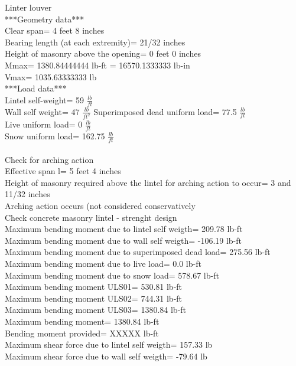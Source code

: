 Linter louver \\
***Geometry data*** \\
Clear span=  4 feet 8 inches \\
Bearing length (at each extremity)=  21/32 inches \\
Height of masonry above the opening=  0 feet 0 inches \\
Mmax=  1380.84444444 lb-ft = 16570.1333333  lb-in \\
Vmax=  1035.63333333 lb \\
***Load data*** \\
Lintel self-weight=  59  $\frac{lb}{ft}$ \\
Wall self weight=  47 $\frac{lb}{ft^2}$
Superimposed dead uniform load=  77.5 $\frac{lb}{ft}$ \\
Live uniform load=  0 $\frac{lb}{ft}$ \\
Snow uniform load=  162.75 $\frac{lb}{ft}$ \\
 \\
Check for arching action \\
Effective span l=  5 feet 4 inches \\
Height of masonry required above the lintel for arching action to occur=  3 and 11/32 inches \\
Arching action occurs (not considered conservatively \\
Check concrete masonry lintel - strenght design \\
Maximum bending moment due to lintel self weigth=  209.78 lb-ft \\
Maximum bending moment due to wall self weigth=  -106.19 lb-ft \\
Maximum bending moment due to superimposed dead load=  275.56 lb-ft \\
Maximum bending moment due to live load=  0.0 lb-ft \\
Maximum bending moment due to snow load=  578.67 lb-ft \\
Maximum bending moment ULS01=  530.81 lb-ft \\
Maximum bending moment ULS02=  744.31 lb-ft \\
Maximum bending moment ULS03=  1380.84 lb-ft \\
Maximum bending moment=  1380.84 lb-ft \\
Bending moment provided= XXXXX lb-ft \\
Maximum shear force due to lintel self weigth=  157.33 lb \\
Maximum shear force due to wall self weigth=  -79.64 lb \\
